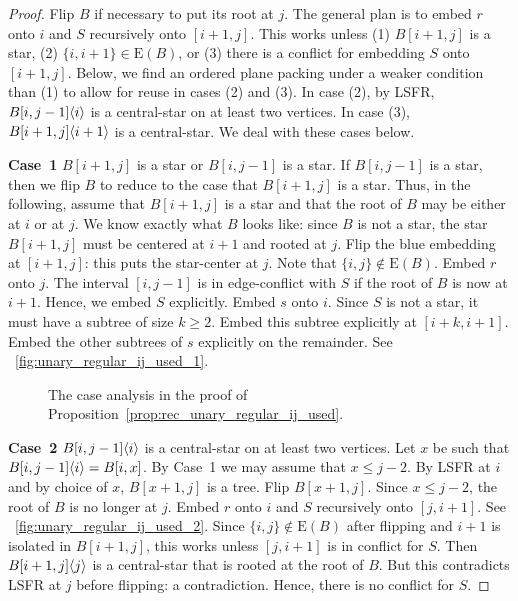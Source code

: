 \documentclass[11pt,a4paper,colorlinks=true,urlcolor=blue,citecolor=red]{article}
\theoremstyle{plain}
\newcommand{\case}[1]{\par\vspace{.5\baselineskip}\noindent\textbf{\sffamily Case~#1}}
\newcommand{\EB}{\mathrm{E}(B)}
\begin{document}
\begin{proof}
  Flip $B$ if necessary to put its root at $j$. The general plan is
  to embed $r$ onto $i$ and $S$ recursively onto $[i+1,j]$. This works
  unless (1) $B[i+1,j]$ is a star, (2) $\{i,i+1\}\in\EB$, or (3) there
  is a conflict for embedding $S$ onto $[i+1,j]$. Below, we find an ordered
  plane packing under a weaker condition than (1) to allow for reuse in
  cases (2) and (3).
  In case (2), by LSFR, $B{[i,j-1]}\langle{i}\rangle$ is a central-star on at
  least two vertices. In case (3), $B{[i+1,j]}\langle{i+1}\rangle$ is a
  central-star. We deal with these cases below.

  \case{1} $B[i+1,j]$ is a star or $B[i,j-1]$ is a star. If $B[i,j-1]$
  is a star, then we flip $B$ to reduce to the case that
  $B[i+1,j]$ is a star. Thus, in the following, assume that $B[i+1,j]$
  is a star and that the root of $B$ may be either at $i$ or at
  $j$. We know exactly what $B$ looks like: since $B$ is not a
  star, the star $B[i+1,j]$ must be centered at $i+1$ and rooted at $j$.
  Flip the blue embedding at $[i+1,j]$: this puts the star-center at
  $j$. Note that $\{i,j\}\not\in\EB$. Embed $r$ onto $j$. The
  interval $[i,j-1]$ is in edge-conflict with $S$ if the root of
  $B$ is now at $i+1$. Hence, we embed $S$ explicitly. Embed $s$
  onto $i$. Since $S$ is not a star, it must have a subtree of size
  $k\geq2$. Embed this subtree explicitly at $[i+k,i+1]$. Embed the
  other subtrees of $s$ explicitly on the remainder. See
  \figurename~\ref{fig:unary_regular_ij_used_1}.

  \begin{figure}[t]
    \centering
    \hfil
    \hfil
    \hfil
    \caption{The case analysis in the proof of
      Proposition~\ref{prop:rec_unary_regular_ij_used}.}
    \label{fig:unary_regular}
  \end{figure}

  \case{2} $B{[i,j-1]}\langle{i}\rangle$ is a central-star on at least two
  vertices. Let $x$ be such that $B{[i,j-1]}\langle{i}\rangle=B[i,x]$. By Case~1
  we may assume that $x\leq j-2$. By LSFR at $i$ and by choice of $x$,
  $B[x+1,j]$ is a tree. Flip $B[x+1,j]$. Since $x\leq j-2$, the root of
  $B$ is no longer at $j$. Embed $r$ onto $i$ and $S$ recursively onto
  $[j,i+1]$. See \figurename~\ref{fig:unary_regular_ij_used_2}. Since
  $\{i,j\}\not\in\EB$ after flipping and $i+1$ is isolated in
  $B[i+1,j]$, this works unless $[j,i+1]$ is in conflict for $S$. Then
  $B{[i+1,j]}\langle{j}\rangle$ is a central-star that is rooted at the root of
  $B$. But this contradicts LSFR at $j$ before flipping: a
  contradiction. Hence, there is no conflict for $S$.


\end{proof}
\end{document}
